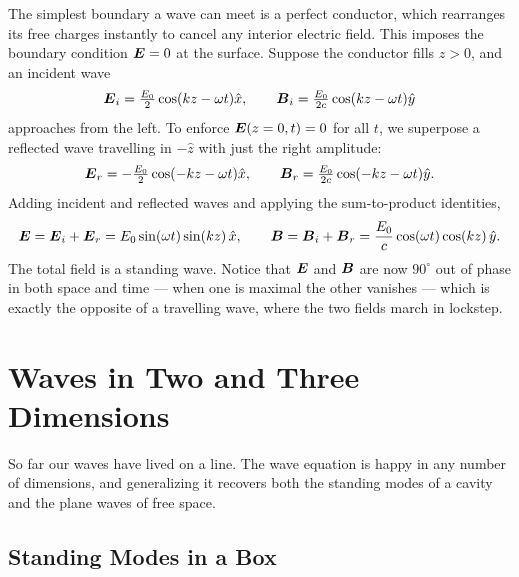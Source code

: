 The simplest boundary a wave can meet is a perfect conductor, which rearranges its free charges instantly to cancel any interior electric field. This imposes the boundary condition $\vect{E} = 0$ at the surface. Suppose the conductor fills $z > 0$, and an incident wave
\begin{equation}
    \vect{E}_i = \tfrac{E_0}{2}\cos(kz - \omega t)\hat{x}, \qquad
    \vect{B}_i = \tfrac{E_0}{2c}\cos(kz - \omega t)\hat{y}
\end{equation}
approaches from the left. To enforce $\vect{E}(z=0,t) = 0$ for all $t$, we superpose a reflected wave travelling in $-\hat{z}$ with just the right amplitude:
\begin{equation}
    \vect{E}_r = -\tfrac{E_0}{2}\cos(-kz - \omega t)\hat{x}, \qquad
    \vect{B}_r = \tfrac{E_0}{2c}\cos(-kz - \omega t)\hat{y}.
\end{equation}
Adding incident and reflected waves and applying the sum-to-product identities,
\begin{equation}
    \vect{E} = \vect{E}_i + \vect{E}_r = E_0\sin(\omega t)\sin(kz)\,\hat{x},
    \qquad
    \vect{B} = \vect{B}_i + \vect{B}_r = \frac{E_0}{c}\cos(\omega t)\cos(kz)\,\hat{y}.
\end{equation}
The total field is a standing wave. Notice that $\vect{E}$ and $\vect{B}$ are now $90^\circ$ out of phase in both space and time --- when one is maximal the other vanishes --- which is exactly the opposite of a travelling wave, where the two fields march in lockstep.

\section{Waves in Two and Three Dimensions}

So far our waves have lived on a line. The wave equation is happy in any number of dimensions, and generalizing it recovers both the standing modes of a cavity and the plane waves of free space.

\subsection{Standing Modes in a Box}

